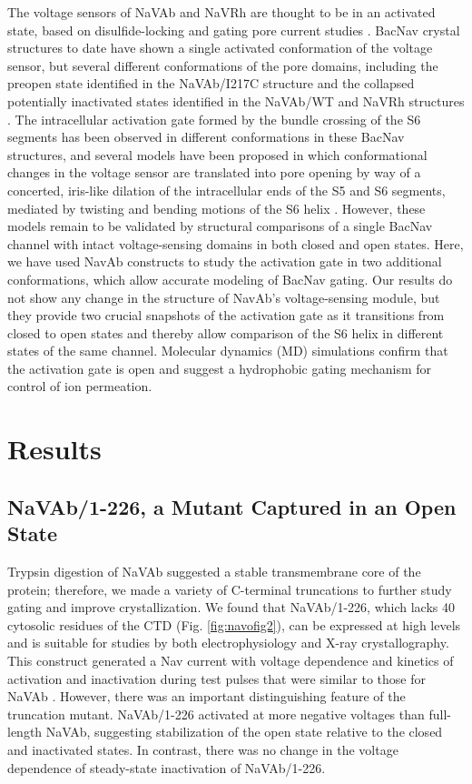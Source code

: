 \begin{refsection}
The voltage sensors of NaVAb and NaVRh are thought to be in an activated state, based on disulfide-locking and gating pore current studies \cite{DeCaen:2011ij,DeCaen:2009hc,DeCaen:2008eq,GamalElDin:2014bz}. BacNav crystal structures to date have shown a single activated conformation of the voltage sensor, but several different conformations of the pore domains, including the preopen state identified in the NaVAb/I217C structure and the collapsed potentially inactivated states identified in the NaVAb/WT and NaVRh structures \cite{Catterall:2015dh}. The intracellular activation gate formed by the bundle crossing of the S6 segments has been observed in different conformations in these BacNav structures, and several models have been proposed in which conformational changes in the voltage sensor are translated into pore opening by way of a concerted, iris-like dilation of the intracellular ends of the S5 and S6 segments, mediated by twisting and bending motions of the S6 helix \cite{Catterall:2015dh,Payandeh:2012ib,Bagneris:2014eh}. However, these models remain to be validated by structural comparisons of a single BacNav channel with intact voltage-sensing domains in both closed and open states. Here, we have used NavAb constructs to study the activation gate in two additional conformations, which allow accurate modeling of BacNav gating. Our results do not show any change in the structure of NavAb's voltage-sensing module, but they provide two crucial snapshots of the activation gate as it transitions from closed to open states and thereby allow comparison of the S6 helix in different states of the same channel. Molecular dynamics (MD) simulations confirm that the activation gate is open and suggest a hydrophobic gating mechanism for control of ion permeation.

\section{Results}

\subsection{NaVAb/1-226, a Mutant Captured in an Open State}
Trypsin digestion of NaVAb suggested a stable transmembrane core of the protein; therefore, we made a variety of C-terminal truncations to further study gating and improve crystallization. We found that NaVAb/1-226, which lacks 40 cytosolic residues of the CTD (Fig. \ref{fig:navofig2}), can be expressed at high levels and is suitable for studies by both electrophysiology and X-ray crystallography. This construct generated a Nav current with voltage dependence and kinetics of activation and inactivation during test pulses that were similar to those for NaVAb \cite{Lenaeus:2017bf}. However, there was an important distinguishing feature of the truncation mutant. NaVAb/1-226 activated at more negative voltages than full-length NaVAb, suggesting stabilization of the open state relative to the closed and inactivated states. In contrast, there was no change in the voltage dependence of steady-state inactivation of NaVAb/1-226.


\end{refsection}
